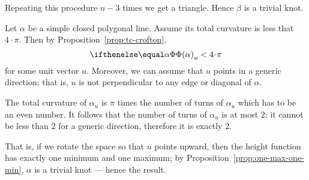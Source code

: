 Repeating this procedure $n-3$ times we get a triangle.
Hence $\beta$ is a trivial knot.
\qeds

Let $\alpha$ be a simple closed polygonal line.
Assume its total curvature is less that $4\cdot\pi$.
Then by Proposition~\ref{prop:tc-crofton}, 
\[\tc\alpha_u<4\cdot\pi\]
for some unit vector $u$.
Moreover, we can assume that $u$ points in a generic direction;
that is, $u$ is not perpendicular to any edge or diagonal of $\alpha$.

The total curvature of $\alpha_u$ is $\pi$ times the number of turns of $\alpha_u$
which has to be an even number.
It follows that the number of turns of $\alpha_u$ is at most $2$;
it cannot be less than 2 for a generic direction, therefore it is exactly $2$.

That is, if we rotate the space so that $u$ points upward,
then the height function has exactly one minimum and one maximum;
by Proposition~\ref{prop:one-max-one-min}, $\alpha$ is a trivial knot --- hence the result.
\qeds
